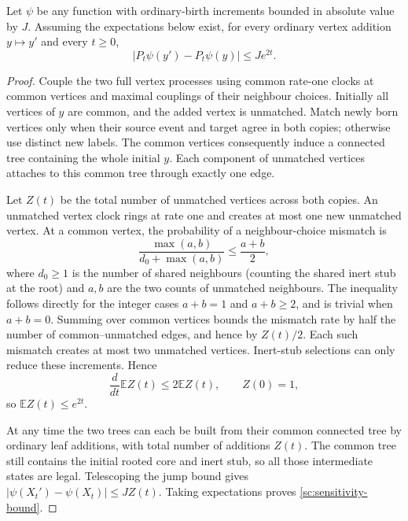 \begin{lemma}
\label{sc:sensitivity}
Let $\psi$ be any function with ordinary-birth increments bounded in
absolute value by $J$.  Assuming the expectations below exist, for every
ordinary vertex addition $y\mapsto y'$ and every $t\ge0$,
\begin{equation}\label{sc:sensitivity-bound}
 |P_t\psi(y')-P_t\psi(y)|\le J e^{2t}.
\end{equation}
\end{lemma}
\begin{proof}
Couple the two full vertex processes using common rate-one clocks at
common vertices and maximal couplings of their neighbour choices.
Initially all vertices of $y$ are common, and the added vertex is
unmatched.  Match newly born vertices only when their source event and
target agree in both copies; otherwise use distinct new labels.
The common vertices consequently induce a connected tree containing the
whole initial $y$.  Each component of unmatched vertices attaches to
this common tree through exactly one edge.

Let $Z(t)$ be the total number of unmatched vertices across both copies.
An unmatched vertex clock rings at rate one and creates at most one
new unmatched vertex.  At a common vertex, the probability of a
neighbour-choice mismatch is
\[
 \frac{\max(a,b)}{d_0+\max(a,b)}\le\frac{a+b}{2},
\]
where $d_0\ge1$ is the number of shared neighbours (counting the shared
inert stub at the root) and $a,b$ are the two counts of unmatched
neighbours.  The inequality follows directly for the integer cases
$a+b=1$ and $a+b\ge2$, and is trivial when $a+b=0$.
Summing over common vertices bounds the mismatch rate by half the
number of common--unmatched edges, and hence by $Z(t)/2$.
Each such mismatch creates at most two unmatched vertices.  Inert-stub
selections can only reduce these increments.  Hence
\[
 \frac{d}{dt}\mathbb EZ(t)\le2\mathbb EZ(t),
 \qquad Z(0)=1,
\]
so $\mathbb EZ(t)\le e^{2t}$.

At any time the two trees can each be built from their common connected
tree by ordinary leaf additions, with total number of additions $Z(t)$.
The common tree still contains the initial rooted core and inert stub,
so all those intermediate states are legal.  Telescoping the jump bound
gives $|\psi(X_t')-\psi(X_t)|\le JZ(t)$.  Taking expectations proves
\eqref{sc:sensitivity-bound}.
\end{proof}

